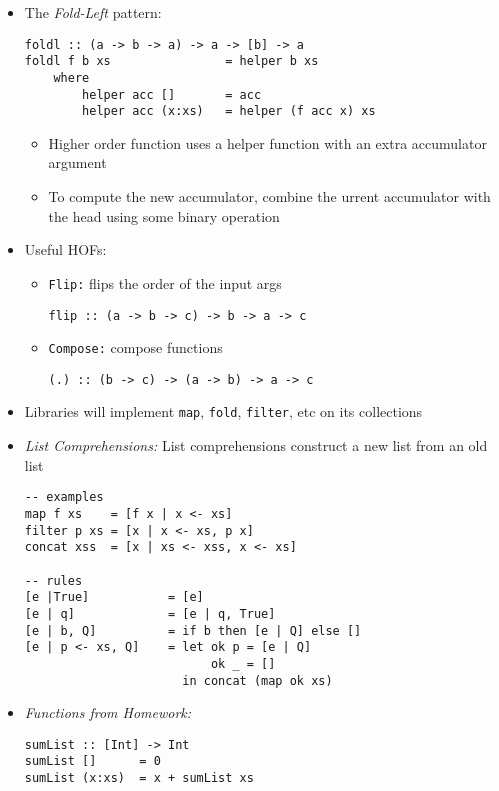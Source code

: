\documentclass[landscape,8pt]{extarticle}
\newcommand{\code}{\lstinline}
\begin{document}
\begin{multicols}{3}
\begin{itemize}
\begin{itemize}
                  \item \code{cat = foldr (\x n -> x ++ n) ""}
              \end{itemize}
        \item The \emph{Fold-Left} pattern:
              \begin{lstlisting}
foldl :: (a -> b -> a) -> a -> [b] -> a
foldl f b xs                = helper b xs
    where
        helper acc []       = acc
        helper acc (x:xs)   = helper (f acc x) xs
            \end{lstlisting}
              \begin{itemize}
                  \item Higher order function uses a helper function with an extra accumulator argument
                  \item To compute the new accumulator, combine the urrent accumulator with the head using some binary operation
              \end{itemize}
        \item Useful HOFs:
              \begin{itemize}
                  \item \code{Flip:} flips the order of the input args
                        \begin{lstlisting}
flip :: (a -> b -> c) -> b -> a -> c
                \end{lstlisting}
                  \item \code{Compose:} compose functions
                        \begin{lstlisting}
(.) :: (b -> c) -> (a -> b) -> a -> c
                \end{lstlisting}
              \end{itemize}
        \item Libraries will implement \code{map}, \code{fold}, \code{filter}, etc on its collections
        \item \emph{List Comprehensions:} List comprehensions construct a new list from an old list
              \begin{lstlisting}
-- examples
map f xs    = [f x | x <- xs]
filter p xs = [x | x <- xs, p x]
concat xss  = [x | xs <- xss, x <- xs]

-- rules
[e |True]           = [e]
[e | q]             = [e | q, True]
[e | b, Q]          = if b then [e | Q] else []
[e | p <- xs, Q]    = let ok p = [e | Q]
                          ok _ = []
                      in concat (map ok xs)
            \end{lstlisting}
            \item \emph{Functions from Homework:}
\begin{lstlisting}
sumList :: [Int] -> Int
sumList []      = 0
sumList (x:xs)  = x + sumList xs
\end{lstlisting}


\end{itemize}
\end{multicols}
\end{document}
